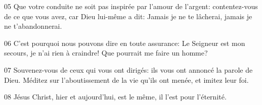 
05 Que votre conduite ne soit pas inspirée par l’amour de l’argent: contentez-vous de ce que vous avez, car Dieu lui-même a dit: Jamais je ne te lâcherai, jamais je ne t’abandonnerai.

06 C’est pourquoi nous pouvons dire en toute assurance: Le Seigneur est mon secours, je n’ai rien à craindre! Que pourrait me faire un homme?

07 Souvenez-vous de ceux qui vous ont dirigés: ils vous ont annoncé la parole de Dieu. Méditez sur l’aboutissement de la vie qu’ils ont menée, et imitez leur foi.

08 Jésus Christ, hier et aujourd’hui, est le même, il l’est pour l’éternité.

